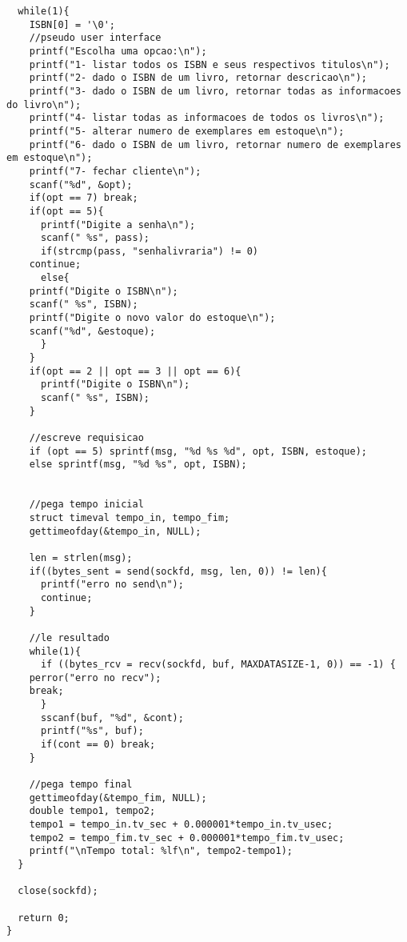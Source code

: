 \documentclass[11pt, brazil]{article} %
\begin{document}
\begin{verbatim}
  while(1){
    ISBN[0] = '\0';
    //pseudo user interface
    printf("Escolha uma opcao:\n");
    printf("1- listar todos os ISBN e seus respectivos titulos\n");
    printf("2- dado o ISBN de um livro, retornar descricao\n");
    printf("3- dado o ISBN de um livro, retornar todas as informacoes do livro\n");
    printf("4- listar todas as informacoes de todos os livros\n");
    printf("5- alterar numero de exemplares em estoque\n");
    printf("6- dado o ISBN de um livro, retornar numero de exemplares em estoque\n");
    printf("7- fechar cliente\n");
    scanf("%d", &opt);
    if(opt == 7) break;
    if(opt == 5){
      printf("Digite a senha\n");
      scanf(" %s", pass);
      if(strcmp(pass, "senhalivraria") != 0)
	continue;
      else{
	printf("Digite o ISBN\n");
	scanf(" %s", ISBN);
	printf("Digite o novo valor do estoque\n");
	scanf("%d", &estoque);
      }
    }
    if(opt == 2 || opt == 3 || opt == 6){
      printf("Digite o ISBN\n");
      scanf(" %s", ISBN);
    }
		
    //escreve requisicao
    if (opt == 5) sprintf(msg, "%d %s %d", opt, ISBN, estoque);
    else sprintf(msg, "%d %s", opt, ISBN);  
		
		
    //pega tempo inicial
    struct timeval tempo_in, tempo_fim;
    gettimeofday(&tempo_in, NULL);
		
    len = strlen(msg);
    if((bytes_sent = send(sockfd, msg, len, 0)) != len){
      printf("erro no send\n");
      continue;	
    }
	
    //le resultado
    while(1){
      if ((bytes_rcv = recv(sockfd, buf, MAXDATASIZE-1, 0)) == -1) {
	perror("erro no recv");
	break;
      }
      sscanf(buf, "%d", &cont);    		    
      printf("%s", buf);
      if(cont == 0) break;
    }
		
    //pega tempo final
    gettimeofday(&tempo_fim, NULL);
    double tempo1, tempo2;
    tempo1 = tempo_in.tv_sec + 0.000001*tempo_in.tv_usec;
    tempo2 = tempo_fim.tv_sec + 0.000001*tempo_fim.tv_usec;
    printf("\nTempo total: %lf\n", tempo2-tempo1);
  }

  close(sockfd);

  return 0;
}

\end{verbatim}
\end{document}
